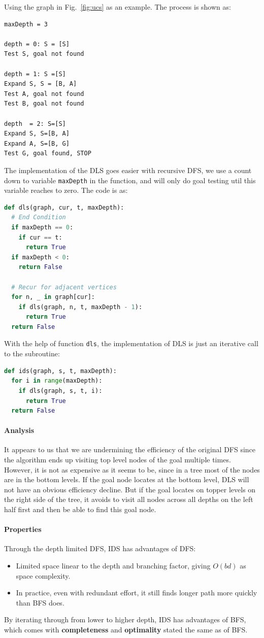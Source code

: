 \documentclass[../main.tex]{subfiles}
\begin{document}
Using the graph in Fig.~\ref{fig:ucs} as an example. The process is shown as:
\begin{lstlisting}[numbers=none]
maxDepth = 3

depth = 0: S = [S]
Test S, goal not found

depth = 1: S =[S]
Expand S, S = [B, A]
Test A, goal not found
Test B, goal not found

depth  = 2: S=[S]
Expand S, S=[B, A]
Expand A, S=[B, G]
Test G, goal found, STOP
\end{lstlisting}
The implementation of the DLS goes easier with recursive DFS, we use a count down to variable \texttt{maxDepth} in the function, and will only do goal testing util this variable reaches to zero. The code is as:
\begin{lstlisting}[language=Python]
def dls(graph, cur, t, maxDepth):
  # End Condition
  if maxDepth == 0:
    if cur == t:
      return True
  if maxDepth < 0:
    return False

  # Recur for adjacent vertices
  for n, _ in graph[cur]:
    if dls(graph, n, t, maxDepth - 1):
      return True
  return False
\end{lstlisting}
With the help of function \texttt{dls}, the implementation of DLS is just an iterative call to the subroutine:
\begin{lstlisting}[language=Python]
def ids(graph, s, t, maxDepth):
  for i in range(maxDepth):
    if dls(graph, s, t, i):
      return True
  return False
\end{lstlisting}
\paragraph{Analysis} It appears to us that we are undermining the efficiency of the original DFS since the algorithm ends up visiting top level nodes of the goal multiple times. However, it is not as expensive as it seems to be, since in a tree most of the nodes are in the bottom levels. If the goal node locates at the bottom level, DLS will not have an obvious efficiency decline. But if the goal locates on topper levels on the right side of the tree, it avoids to visit all nodes across all depths on the left half first and then be able to find this goal node.
\paragraph{Properties} Through the depth limited DFS, IDS has advantages of DFS: 
\begin{itemize}
    \item Limited space linear to the depth and branching factor, giving $O(bd)$ as space complexity.
    \item In practice, even with redundant effort, it still finds longer path more quickly than BFS does.
\end{itemize}
By iterating through from lower to higher depth, IDS has advantages of BFS, which comes with \textbf{completeness} and \textbf{optimality} stated the same as of BFS. 
\end{document}
